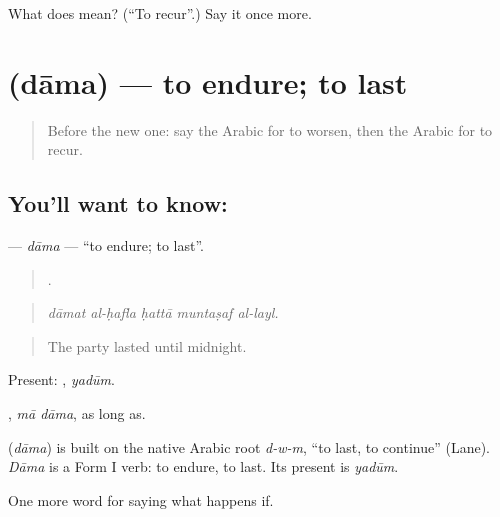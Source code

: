 \begin{tcolorbox}[breakable,colback=teal!4,colframe=teal!35!black,title={Before you move on}]
What does  mean? (\textquotedblleft{}To recur\textquotedblright{}.) Say it once more.
\end{tcolorbox}
\section[\texorpdfstring{\ar{دام} (dāma)}{دام (dāma)}]{ (dāma) — to endure; to last}

\label{lesson:AR-C413-dama}



\begin{quote}
Before the new one: say the Arabic for to worsen, then the Arabic for to recur.
\end{quote}

\subsection*{You'll want to know: }
\textbf{} — \emph{dāma} — \textquotedblleft{}to endure; to last\textquotedblright{}.

\begin{quote}
    .
\end{quote}

\begin{quote}
\emph{dāmat al-ḥafla ḥattā muntaṣaf al-layl.}
\end{quote}

\begin{quote}
The party lasted until midnight.
\end{quote}

Present: , \emph{yadūm}.

 , \emph{mā dāma}, as long as.

\begin{cousinweb}
\textbf{} (\emph{dāma}) is built on the native Arabic root \emph{d-w-m}, \textquotedblleft{}to last, to continue\textquotedblright{} (Lane). \emph{Dāma} is a Form I verb: to endure, to last. Its present is \emph{yadūm}.
\end{cousinweb}

\begin{grammarlens}[title={What you've built}]
One more word for saying what happens if.
\end{grammarlens}

